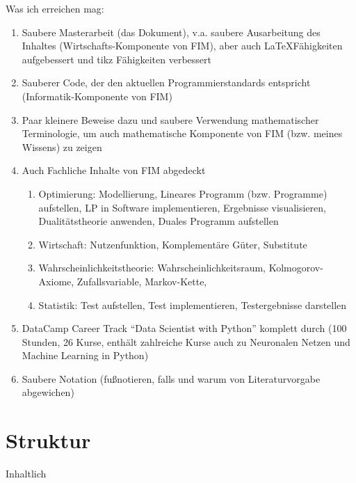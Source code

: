 Was ich erreichen mag:
\begin{enumerate}[noitemsep]
	\item Saubere Masterarbeit (das Dokument), v.a. saubere Ausarbeitung des Inhaltes (Wirtschafts-Komponente von FIM), aber auch \LaTeX Fähigkeiten aufgebessert und tikz Fähigkeiten verbessert
	\item Sauberer Code, der den aktuellen Programmierstandards entspricht (Informatik-Komponente von FIM)
	\item Paar kleinere Beweise dazu und saubere Verwendung mathematischer Terminologie, um auch mathematische Komponente von FIM (bzw. meines Wissens) zu zeigen
	\item Auch Fachliche Inhalte von FIM abgedeckt
	\begin{enumerate}[noitemsep]
		\item Optimierung: Modellierung, Lineares Programm (bzw. Programme) aufstellen, LP in Software implementieren, Ergebnisse visualisieren, Dualitätstheorie anwenden, Duales Programm aufstellen
		\item Wirtschaft: Nutzenfunktion, Komplementäre Güter, Substitute
		\item Wahrscheinlichkeitstheorie: Wahrscheinlichkeitsraum, Kolmogorov-Axiome, Zufallsvariable, Markov-Kette, 
		\item Statistik: Test aufstellen, Test implementieren, Testergebnisse darstellen
	\end{enumerate}
	\item DataCamp Career Track \enquote{Data Scientist with Python} komplett durch (100 Stunden, 26 Kurse, enthält zahlreiche Kurse auch zu Neuronalen Netzen und Machine Learning in Python)
	\item Saubere Notation (fußnotieren, falls und warum von Literaturvorgabe abgewichen)
\end{enumerate}

\newpage

\section{Struktur}

Inhaltlich

